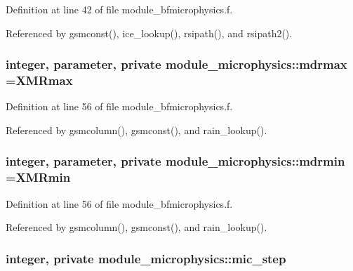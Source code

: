 Definition at line 42 of file module\+\_\+bfmicrophysics.\+f.



Referenced by gsmconst(), ice\+\_\+lookup(), rsipath(), and rsipath2().

\subsubsection[{\texorpdfstring{mdrmax}{mdrmax}}]{\setlength{\rightskip}{0pt plus 5cm}integer, parameter, private module\+\_\+microphysics\+::mdrmax =X\+M\+Rmax\hspace{0.3cm}{\ttfamily [private]}}\hypertarget{namespacemodule__microphysics_aa21f2a4aa4dc086cbe80493ae7da6b8b}{}\label{namespacemodule__microphysics_aa21f2a4aa4dc086cbe80493ae7da6b8b}


Definition at line 56 of file module\+\_\+bfmicrophysics.\+f.



Referenced by gsmcolumn(), gsmconst(), and rain\+\_\+lookup().

\subsubsection[{\texorpdfstring{mdrmin}{mdrmin}}]{\setlength{\rightskip}{0pt plus 5cm}integer, parameter, private module\+\_\+microphysics\+::mdrmin =X\+M\+Rmin\hspace{0.3cm}{\ttfamily [private]}}\hypertarget{namespacemodule__microphysics_aa9201f3dba87b517d0fe88af177c4281}{}\label{namespacemodule__microphysics_aa9201f3dba87b517d0fe88af177c4281}


Definition at line 56 of file module\+\_\+bfmicrophysics.\+f.



Referenced by gsmcolumn(), gsmconst(), and rain\+\_\+lookup().

\subsubsection[{\texorpdfstring{mic\+\_\+step}{mic_step}}]{\setlength{\rightskip}{0pt plus 5cm}integer, private module\+\_\+microphysics\+::mic\+\_\+step\hspace{0.3cm}{\ttfamily [private]}}\hypertarget{namespacemodule__microphysics_acb3899d31d6f2079a2d41c3e551e3443}{}\label{namespacemodule__microphysics_acb3899d31d6f2079a2d41c3e551e3443}


